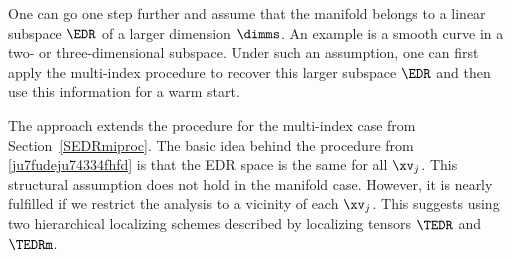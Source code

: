 One can go one step further and assume that the manifold belongs to a linear subspace \( \EDR \) of a larger dimension \( \dimms \).
An example is a smooth curve in a two- or three-dimensional subspace.
Under such an assumption, one can first apply the multi-index procedure to recover this larger subspace \( \EDR \)
and then use this information for a warm start.

The approach extends the procedure for the multi-index case from Section~\ref{SEDRmiproc}.
The basic idea behind the procedure from \eqref{ju7fudeju74334fhfd} is that the EDR space 
is the same for all \( \xv_{j} \).
This structural assumption does not hold in the manifold case.
However, it is nearly fulfilled if we restrict the analysis to a vicinity of each \( \xv_{j} \).
This suggests using two hierarchical localizing schemes described by 
localizing tensors \( \TEDR \) and \( \TEDRm \).

